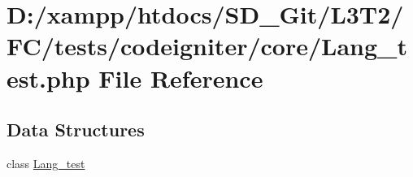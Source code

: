 \hypertarget{_lang__test_8php}{}\section{D\+:/xampp/htdocs/\+S\+D\+\_\+\+Git/\+L3\+T2/\+F\+C/tests/codeigniter/core/\+Lang\+\_\+test.php File Reference}
\label{_lang__test_8php}
\subsection*{Data Structures}
\begin{DoxyCompactItemize}
\item 
class \hyperlink{class_lang__test}{Lang\+\_\+test}
\end{DoxyCompactItemize}
